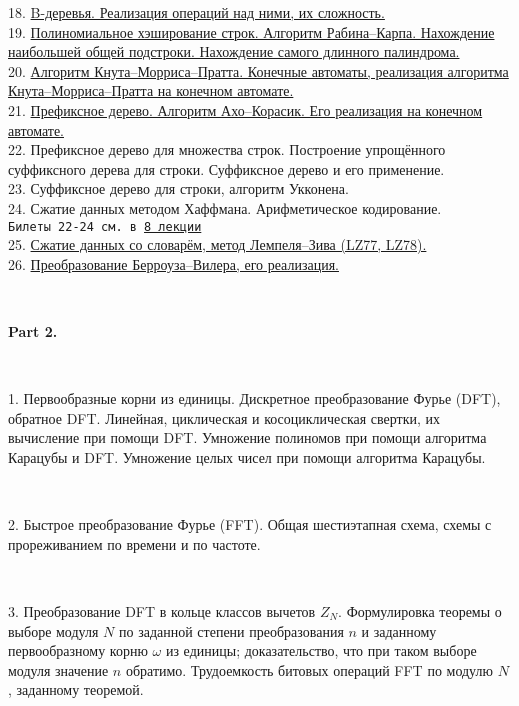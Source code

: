 \documentclass[a4paper]{article}
\theoremstyle{indented}
\theoremstyle{definition}
\theoremstyle{remark}
\begin{document}
18. \hyperlink{t29}{B-деревья. Реализация операций над ними, их сложность.} \\ 

19. \hyperlink{t30}{Полиномиальное хэширование строк. Алгоритм Рабина–Карпа. Нахождение наибольшей общей подстроки. Нахождение самого длинного палиндрома.}  \\ 

20. \hyperlink{e3}{Алгоритм Кнута–Морриса–Пратта. Конечные автоматы, реализация алгоритма Кнута–Морриса–Пратта на конечном автомате.} \\ 

21. \hyperlink{t32}{Префиксное дерево. Алгоритм Ахо–Корасик. Его реализация на конечном автомате.} \\ 

22. Префиксное дерево для множества строк. Построение упрощённого суффиксного дерева для строки. Суффиксное дерево и его применение. \\ 

23. Суффиксное дерево для строки, алгоритм Укконена.  \\ 

24. Сжатие данных методом Хаффмана. Арифметическое кодирование. \\ 

\texttt{Билеты 22-24 см. в \href{https://users.math-cs.spbu.ru/~okhotin/teaching/algorithms_2020/okhotin_algorithms_2020_l8.pdf}{8 лекции}} \\

25. \hyperlink{t35}{Сжатие данных со словарём, метод Лемпеля–Зива (LZ77, LZ78).} \\ 

26. \hyperlink{t37}{Преобразование Берроуза–Вилера, его реализация.}

\ 

\textbf{Part 2.}

\ 

1. Первообразные корни из единицы. Дискретное преобразование Фурье (DFT), обратное DFT. Линейная, циклическая и косоциклическая свертки, их вычисление при помощи DFT. Умножение полиномов при помощи алгоритма Карацубы и DFT. Умножение целых чисел при помощи алгоритма Карацубы.

\ 

2. Быстрое преобразование Фурье (FFT). Общая шестиэтапная схема, схемы с прореживанием по времени и по частоте.

\ 

3. Преобразование DFT в кольце классов вычетов $Z_N$. Формулировка теоремы о выборе модуля $N$ по заданной степени преобразования $n$ и заданному первообразному корню $\omega$ из единицы; доказательство, что при таком выборе модуля значение $n$ обратимо. Трудоемкость битовых операций FFT по модулю $N$, заданному теоремой. 
\end{document}
